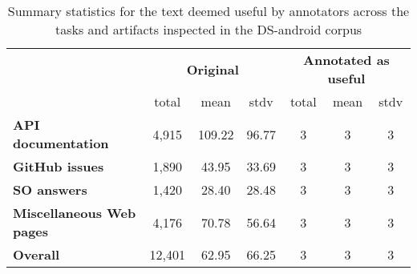 \begin{table} %
\centering    
\begin{scriptsize}
\begin{threeparttable}
\begin{tabular}{lcccccc}


& \multicolumn{3}{c}{\textbf{Original}}
& \multicolumn{3}{c}{\textbf{Annotated as useful}}
\\ \cmidrule(l){2-4} \cmidrule(l){5-7}

& total & mean & stdv &  total & mean & stdv \\

\hline
\hline

\textbf{API documentation} 
& 4,915 & 109.22 & 96.77 & 3 & 3 & 3
\\
\textbf{GitHub issues} 
& 1,890 &  43.95 & 33.69 &  3 & 3 & 3
\\
\textbf{SO answers} 
& 1,420 & 28.40 & 28.48 & 3 &  3 & 3
\\
\textbf{Miscellaneous Web pages} 
& 4,176 & 70.78 & 56.64 
& 3 & 3 & 3
\\

\hline
\hline
\textbf{Overall} 
& 12,401 & 62.95 & 66.25 
& 3 & 3 & 3
\\
\hline

\end{tabular}
\end{threeparttable}
\end{scriptsize}
\caption{Summary statistics for the text deemed useful by annotators across the tasks and  artifacts inspected in the \acs{DS-android} corpus}
\label{tbl:corpus-annotation-summary}
\end{table}

